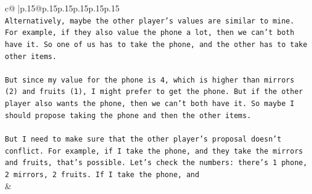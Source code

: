 \documentclass{article}
\begin{document}
{\begin{supertabular}{c@{$\;$}|p{.15\linewidth}@{}p{.15\linewidth}p{.15\linewidth}p{.15\linewidth}p{.15\linewidth}p{.15\linewidth}}
{{{\\ 
\texttt{Alternatively, maybe the other player's values are similar to mine. For example, if they also value the phone a lot, then we can't both have it. So one of us has to take the phone, and the other has to take other items. } \\
\\ 
\texttt{But since my value for the phone is 4, which is higher than mirrors (2) and fruits (1), I might prefer to get the phone. But if the other player also wants the phone, then we can't both have it. So maybe I should propose taking the phone and then the other items. } \\
\\ 
\texttt{But I need to make sure that the other player's proposal doesn't conflict. For example, if I take the phone, and they take the mirrors and fruits, that's possible. Let's check the numbers: there's 1 phone, 2 mirrors, 2 fruits. If I take the phone, and} \\
            }
        }
    }
    & \\ \\


\end{supertabular}}
\end{document}
